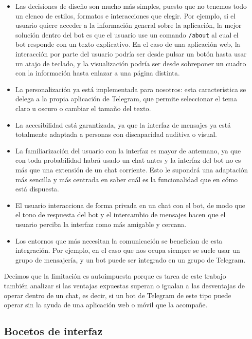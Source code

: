 \begin{itemize}
    \item Las decisiones de diseño son mucho más simples, puesto que no tenemos todo un elenco de estilos, formatos e interacciones que elegir. Por ejemplo, si el usuario quiere acceder a la información general sobre la aplicación, la mejor solución dentro del bot es que el usuario use un comando \texttt{/about} al cual el bot responde con un texto explicativo. En el caso de una aplicación web, la interacción por parte del usuario podría ser desde pulsar un botón hasta usar un atajo de teclado, y la visualización podría ser desde sobreponer un cuadro con la información hasta enlazar a una página distinta.
    \item La personalización ya está implementada para nosotros: esta característica se delega a la propia aplicación de Telegram, que permite seleccionar el tema claro u oscuro o cambiar el tamaño del texto.
    \item La accesibilidad está garantizada, ya que la interfaz de mensajes ya está totalmente adaptada a personas con discapacidad auditiva o visual.
    \item La familiarización del usuario con la interfaz es mayor de antemano, ya que con toda probabilidad habrá usado un chat antes y la interfaz del bot no es más que una extensión de un chat corriente. Esto le supondrá una adaptación más sencilla y más centrada en saber cuál es la funcionalidad que en cómo está dispuesta.
    \item El usuario interacciona de forma privada en un chat con el bot, de modo que el tono de respuesta del bot y el intercambio de mensajes hacen que el usuario perciba la interfaz como más amigable y cercana.
    \item Los entornos que más necesitan la comunicación se benefician de esta integración. Por ejemplo, en el caso que nos ocupa siempre se suele usar un grupo de mensajería, y un bot puede ser integrado en un grupo de Telegram.
\end{itemize}

Decimos que la limitación es autoimpuesta porque es tarea de este trabajo también analizar si las ventajas expuestas superan o igualan a las desventajas de operar dentro de un chat, es decir, si un bot de Telegram de este tipo puede operar sin la ayuda de una aplicación web o móvil que la acompañe.


\subsection{Bocetos de interfaz}

